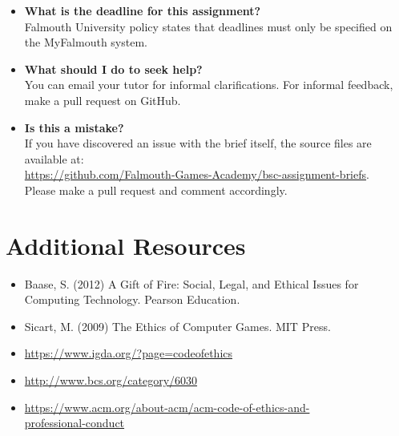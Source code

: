 \documentclass{../fal_assignment}
\begin{document}
\begin{itemize}
	\item 	\textbf{What is the deadline for this assignment?} \\ 
    		Falmouth University policy states that deadlines must only be specified on the MyFalmouth system.
    		
	\item 	\textbf{What should I do to seek help?} \\ 
    		You can email your tutor for informal clarifications. For informal feedback, make a pull request on GitHub. 
    		
    	\item 	\textbf{Is this a mistake?} \\ 	
    		If you have discovered an issue with the brief itself, the source files are available at: \\
    		\url{https://github.com/Falmouth-Games-Academy/bsc-assignment-briefs}.\\
    		 Please make a pull request and comment accordingly.
\end{itemize}

\section*{Additional Resources}

\begin{itemize}
    \item Baase, S. (2012) A Gift of Fire: Social, Legal, and Ethical Issues for Computing Technology. Pearson Education.
    \item Sicart, M. (2009) The Ethics of Computer Games. MIT Press.
    \item \url{https://www.igda.org/?page=codeofethics}
    \item \url{http://www.bcs.org/category/6030}
    \item \url{https://www.acm.org/about-acm/acm-code-of-ethics-and-} \\ \url{professional-conduct}
\end{itemize}

\rubricyeartwo
\end{document}
